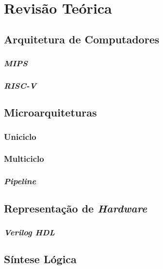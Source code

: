 \chapter{Revisão Teórica}\label{cap_revisao}

\section{Arquitetura de Computadores}
{}

    \subsection{\textit{MIPS}}
    {}

    \subsection{\textit{RISC-V}}
    {}

\section{Microarquiteturas}
{}

    \subsection{Uniciclo}
    {}

    \subsection{Multiciclo}
    {}

    \subsection{\textit{Pipeline}}
    {}

\section{Representação de \textit{Hardware}}
{}

    \subsection{\textit{Verilog HDL}}
    {}

\section{Síntese Lógica}
{}

